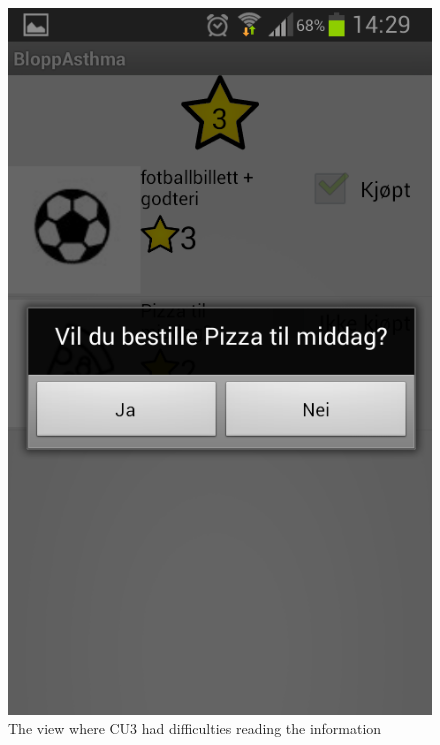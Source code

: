 \begin{figure}[H]
	\centering
	\includegraphics[width=0.25\paperwidth]{Pictures/app-screenshots/asthmapp-buy-screen.png}
	\caption{The view where CU3 had difficulties reading the information}
	\label{fig:asthmapp-purchase}
\end{figure}